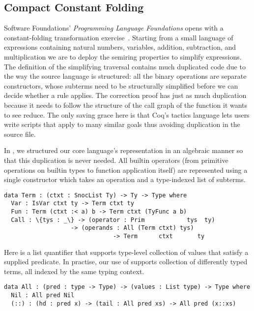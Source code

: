 \subsection{Compact Constant Folding}
\label{sec:design:constants}

Software Foundations' \emph{Programming Language Foundations} opens with a constant-folding transformation exercise~\cite[Chapter~1]{Pierce:SF2}.
%
Starting from a small language of expressions containing natural numbers, variables, addition, subtraction, and multiplication we are to deploy the semiring properties to simplify expressions.
%
The definition of the simplifying traversal contains much duplicated code due to the way the source language is structured:
%
all the binary operations are separate constructors, whose subterms need to be structurally simplified before we can decide whether a rule applies.
%
The correction proof has just as much duplication because it needs to follow the structure of the call graph of the function it wants to see reduce.
%
The only saving grace here is that Coq's tactics language lets users write scripts that apply to many similar goals thus avoiding duplication in the source file.

In \Velo{}, we structured our core language's representation in an algebraic
manner so that this duplication is never needed.
%
All builtin operators (from primitive operations on builtin types to function
application itself) are represented using a single  constructor
which takes an operation and a type-indexed list of subterms.

\begin{Verbatim}
data Term : (ctxt : SnocList Ty) -> Ty -> Type where
  Var : IsVar ctxt ty -> Term ctxt ty
  Fun : Term (ctxt :< a) b -> Term ctxt (TyFunc a b)
  Call : \{tys : _\} -> (operator : Prim            tys  ty)
                   -> (operands : All (Term ctxt) tys)
                               -> Term      ctxt       ty
\end{Verbatim}


Here  is a list quantifier that supports type-level collection of values that satisfy a supplied predicate.
In practise, our use of  supports collection of differently typed terms, all indexed by the same typing context.

\begin{Verbatim}
data All : (pred : type -> Type) -> (values : List type) -> Type where
  Nil : All pred Nil
  (::) : (hd : pred x) -> (tail : All pred xs) -> All pred (x::xs)
\end{Verbatim}

